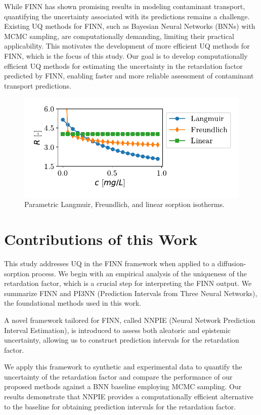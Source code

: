While FINN has shown promising results in modeling contaminant transport, quantifying the uncertainty associated with its predictions remains a challenge. Existing UQ methods for FINN, such as Bayesian Neural Networks (BNNs) with MCMC sampling, are computationally demanding, limiting their practical applicability. This motivates the development of more efficient UQ methods for FINN, which is the focus of this study. Our goal is to develop computationally efficient UQ methods for estimating the uncertainty in the retardation factor predicted by FINN, enabling faster and more reliable assessment of contaminant transport predictions.

\begin{figure}[h]
    \centering
    \includegraphics{figs/parametric_isotherms.pdf}
    \caption{Parametric Langmuir, Freundlich, and linear sorption isotherms.}
    \label{fig:parametric_isotherms}
\end{figure}


\section{Contributions of this Work}
This study addresses UQ in the FINN framework when applied to a diffusion-sorption process. We begin with an empirical analysis of the uniqueness of the retardation factor, which is a crucial step for interpreting the FINN output. We summarize FINN and PI3NN (Prediction Intervals from Three Neural Networks), the foundational methods used in this work.

A novel framework tailored for FINN, called NNPIE (Neural Network Prediction Interval Estimation), is introduced to assess both aleatoric and epistemic uncertainty, allowing us to construct prediction intervals for the retardation factor.

We apply this framework to synthetic and experimental data to quantify the uncertainty of the retardation factor and compare the performance of our proposed methods against a BNN baseline employing MCMC sampling. Our results demonstrate that NNPIE provides a computationally efficient alternative to the baseline for obtaining prediction intervals for the retardation factor.


